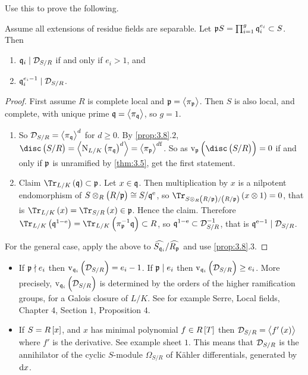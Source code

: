 \pagebreak

Use this to prove the following.

\begin{theorem}
Assume all extensions of residue fields are separable. Let $ \mathfrak{p} S = \prod_{i = 1}^g \mathfrak{q}_i^{e_i} \subset S $. Then
\begin{enumerate}
\item $ \mathfrak{q}_i \mid \mathcal{D}_{S / R} $ if and only if $ e_i > 1 $, and
\item $ \mathfrak{q}_i^{e_i - 1} \mid \mathcal{D}_{S / R} $.
\end{enumerate}
\end{theorem}

\begin{proof}
First assume $ R $ is complete local and $ \mathfrak{p} = \left\langle \pi_{\mathfrak{p}} \right\rangle $. Then $ S $ is also local, and complete, with unique prime $ \mathfrak{q} = \left\langle \pi_{\mathfrak{q}} \right\rangle $, so $ g = 1 $.
\begin{enumerate}
\item So $ \mathcal{D}_{S / R} = \left\langle \pi_{\mathfrak{q}} \right\rangle^d $ for $ d \ge 0 $. By \ref{prop:3.8}.$ 2 $, $ \disc\br{S / R} = \abr{\N_{L / K}\br{\pi_\qqq}^d} = \abr{\pi_\ppp}^{d\f} $. So as $ \v_\ppp\br{\disc\br{S / R}} = 0 $ if and only if $ \mathfrak{p} $ is unramified by \ref{thm:3.5}, get the first statement.
\item Claim $ \Tr_{L / K}\br{\qqq} \subset \ppp $. Let $ x \in \mathfrak{q} $. Then multiplication by $ x $ is a nilpotent endomorphism of $ S \otimes_R \br{R / \ppp} \cong S / \qqq^\e $, so $ \Tr_{S \otimes_R \br{R / \ppp} / \br{R / \ppp}}\br{x \otimes 1} = 0 $, that is $ \Tr_{L / K}\br{x} = \Tr_{S / R}\br{x} \in \ppp $. Hence the claim. Therefore $ \Tr_{L / K}\br{\qqq^{1 - \e}} = \Tr_{L / K}\br{\pi_\ppp^{-1}\qqq} \subset R $, so $ \mathfrak{q}^{1 - \mathrm{e}} \subset \mathcal{D}_{S / R}^{-1} $, that is $ \mathfrak{q}^{\mathrm{e} - 1} \mid \mathcal{D}_{S / R} $.
\end{enumerate}
For the general case, apply the above to $ \widehat{S_{\mathfrak{q}_i}} / \widehat{R_{\mathfrak{p}}} $ and use \ref{prop:3.8}.$ 3 $.
\end{proof}

\begin{fact*}
\hfill
\begin{itemize}
\item If $ \mathfrak{p} \nmid e_i $ then $ \v_{\qqq_i}\br{\DDD_{S / R}} = e_i - 1 $. If $ \mathfrak{p} \mid e_i $ then $ \v_{\qqq_i}\br{\DDD_{S / R}} \ge e_i $. More precisely, $ \v_{\qqq_i}\br{\DDD_{S / R}} $ is determined by the orders of the higher ramification groups, for a Galois closure of $ L / K $. See for example Serre, Local fields, Chapter $ 4 $, Section $ 1 $, Proposition $ 4 $.
\item If $ S = R\sbr{x} $, and $ x $ has minimal polynomial $ f \in R\sbr{T} $ then $ \DDD_{S / R} = \abr{f'\br{x}} $ where $ f' $ is the derivative. See example sheet $ 1 $. This means that $ \mathcal{D}_{S / R} $ is the annihilator of the cyclic $ S $-module $ \Omega_{S / R} $ of K\"ahler differentials, generated by $ \mathrm{d} x $.
\end{itemize}
\end{fact*}

